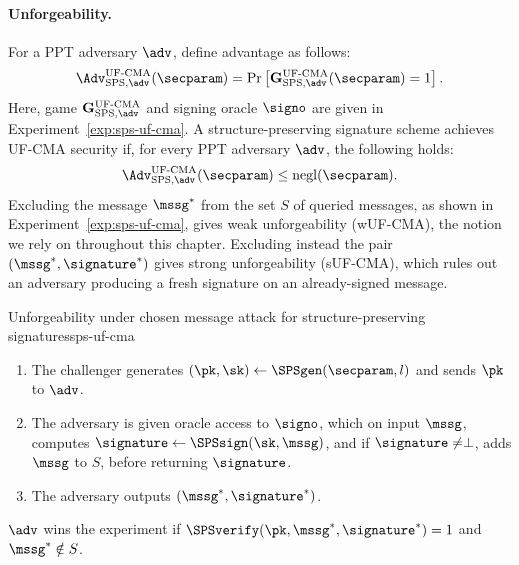 \paragraph{Unforgeability.} For a PPT adversary $\adv$, define advantage as
follows:
%
\begin{equation*}
%
  \Adv_{\mathrm{SPS}, \adv}^{\text{UF-CMA}}(\secparam) = \Pr\left\lbrack
  \mathbf{G}_{\mathrm{SPS}, \adv}^{\text{UF-CMA}}(\secparam) = 1\right\rbrack .
%
\end{equation*}
%
Here, game $\mathbf{G}_{\mathrm{SPS},\adv}^{\text{UF-CMA}}$ and signing oracle
$\signo$ are given in Experiment~\ref{exp:sps-uf-cma}. A structure-preserving
signature scheme achieves UF-CMA security if, for every PPT adversary $\adv$,
the following holds:
%
\begin{equation*}
%
  \Adv_{\mathrm{SPS}, \adv}^{\text{UF-CMA}}(\secparam) \leq
  \operatorname{negl}(\secparam).
%
\end{equation*}
%
Excluding the message $\mssg^*$ from the set $S$ of queried messages, as shown
in Experiment~\ref{exp:sps-uf-cma}, gives weak unforgeability (wUF-CMA), the
notion we rely on throughout this chapter. Excluding instead the pair
$(\mssg^*, \signature^*)$ gives strong unforgeability (sUF-CMA), which rules
out an adversary producing a fresh signature on an already-signed message.

\begin{experimentbox}{Unforgeability under chosen message attack for
  structure-preserving signatures}{sps-uf-cma}

  \begin{enumerate}

    \item The challenger generates $(\pk, \sk) \gets \SPSgen(\secparam, l)$ and
      sends $\pk$ to $\adv$.

    \item The adversary is given oracle access to $\signo$, which on input
      $\mssg$, computes $\signature \gets \SPSsign(\sk, \mssg)$, and if
      $\signature \neq \perp$, adds $\mssg$ to $S$, before returning
      $\signature$.

    \item The adversary outputs $(\mssg^*, \signature^*)$.

  \end{enumerate}

  $\adv$ wins the experiment if $\SPSverify(\pk, \mssg^*, \signature^*) = 1$
  and $\mssg^* \notin S$.

\end{experimentbox}

